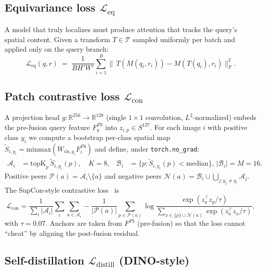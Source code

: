 \documentclass[11pt,a4paper]{article}
\newcommand{\Leq}{\mathcal{L}_{\mathrm{eq}}}
\newcommand{\Lcon}{\mathcal{L}_{\mathrm{con}}}
\newcommand{\Ldist}{\mathcal{L}_{\mathrm{distill}}}
\begin{document}
\subsection{Equivariance loss $\Leq$}

A model that truly localizes must produce attention that tracks the
query's spatial content. Given a transform $T\!\in\!\mathcal{T}$ sampled
uniformly per batch and applied only on the query branch:
\begin{equation}
\Leq(q,r) \;=\; \frac{1}{B H'W'}\sum_{i=1}^{B}
\bigl\|\,T\!\left(M(q_i,r_i)\right)-M\!\left(T(q_i),r_i\right)\bigr\|_{F}^{2}.
\label{eq:Leq}
\end{equation}

\subsection{Patch contrastive loss $\Lcon$}

A projection head $g:\mathbb{R}^{256}\!\to\!\mathbb{R}^{128}$ (single
$1{\times}1$ convolution, $L^2$-normalized) embeds the pre-fusion
query feature $F^{P3}_q$ into $z_{i,p}\!\in\!S^{127}$. For each image
$i$ with positive class $y_i$ we compute a bootstrap per-class spatial
map
$\tilde S_{i,y_i}\!=\!\mathrm{minmax}(W_{\mathrm{cls},y_i}F^{P4}_i)$
and define, under \texttt{torch.no\_grad}:
\begin{align}
\mathcal{A}_i &= \mathrm{topK}_p\,\tilde S_{i,y_i}(p),\quad K=8, &
\mathcal{B}_i &= \{p:\tilde S_{i,y_i}(p)<\text{median}\},\,|\mathcal{B}_i|=M=16.
\end{align}
Positive peers $\mathcal{P}(a)=\mathcal{A}_i\!\setminus\!\{a\}$ and
negative peers $\mathcal{N}(a)=\mathcal{B}_i\cup\bigcup_{j:y_j\neq y_i}\mathcal{A}_j$.
The SupCon-style contrastive loss~\citep{simclr} is
\begin{equation}
\Lcon = \frac{1}{\sum_i|\mathcal{A}_i|}
\sum_{i}\sum_{a\in\mathcal{A}_i}
\!\!-\frac{1}{|\mathcal{P}(a)|}\!\!\sum_{p\in\mathcal{P}(a)}
\!\!\log\frac{\exp(z_a^{\!\top} z_p/\tau)}
{\sum_{x\in\{p\}\cup\mathcal{N}(a)}\exp(z_a^{\!\top} z_x/\tau)},
\label{eq:Lcon}
\end{equation}
with $\tau=0.07$. Anchors are taken from $F^{P3}$ (pre-fusion) so that
the loss cannot ``cheat'' by aligning the post-fusion residual.

\subsection{Self-distillation $\Ldist$ (DINO-style)}
\end{document}
